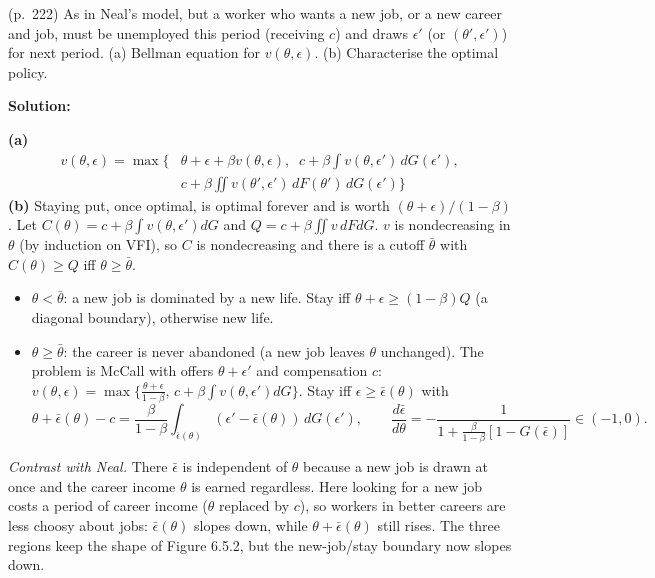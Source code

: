 \documentclass[12pt, letterpaper]{article}
\begin{document}
\begin{tcolorbox}[oddbox,title={Exercise 6.27 \quad Neal Model with Unemployment}]
\begin{tcolorbox}[questionbox]
(p.~222) As in Neal's model, but a worker who wants a new job, or a new career and job, must be unemployed
this period (receiving $c$) and draws $\epsilon'$ (or $(\theta',\epsilon')$) for next period. (a) Bellman equation for
$v(\theta,\epsilon)$. (b) Characterise the optimal policy.
\end{tcolorbox}

\textbf{Solution:}

\textbf{(a)}
\[
\boxed{\begin{aligned}v(\theta,\epsilon)=\max\Big\{&\theta+\epsilon+\beta v(\theta,\epsilon),\;\;c+\beta\int v(\theta,\epsilon')\,dG(\epsilon'),\\&c+\beta\iint v(\theta',\epsilon')\,dF(\theta')\,dG(\epsilon')\Big\}\end{aligned}}
\]
\textbf{(b)} Staying put, once optimal, is optimal forever and is worth $(\theta+\epsilon)/(1-\beta)$. Let
$C(\theta)=c+\beta\int v(\theta,\epsilon')dG$ and $Q=c+\beta\iint v\,dFdG$. $v$ is nondecreasing in $\theta$ (by induction on
VFI), so $C$ is nondecreasing and there is a cutoff $\bar\theta$ with $C(\theta)\ge Q$ iff $\theta\ge\bar\theta$.
\begin{itemize}[itemsep=2pt]
\item $\theta<\bar\theta$: a new job is dominated by a new life. Stay iff $\theta+\epsilon\ge(1-\beta)Q$ (a diagonal boundary), otherwise
new life.
\item $\theta\ge\bar\theta$: the career is never abandoned (a new job leaves $\theta$ unchanged). The problem is McCall with
offers $\theta+\epsilon'$ and compensation $c$: $v(\theta,\epsilon)=\max\{\frac{\theta+\epsilon}{1-\beta},\,c+\beta\int v(\theta,\epsilon')dG\}$. Stay iff
$\epsilon\ge\bar\epsilon(\theta)$ with
\[
\theta+\bar\epsilon(\theta)-c=\frac{\beta}{1-\beta}\int_{\bar\epsilon(\theta)}(\epsilon'-\bar\epsilon(\theta))\,dG(\epsilon'),
\qquad
\frac{d\bar\epsilon}{d\theta}=-\frac{1}{1+\frac{\beta}{1-\beta}[1-G(\bar\epsilon)]}\in(-1,0).
\]
\end{itemize}
\emph{Contrast with Neal.} There $\bar\epsilon$ is independent of $\theta$ because a new job is drawn at once and the
career income $\theta$ is earned regardless. Here looking for a new job costs a period of career income
($\theta$ replaced by $c$), so workers in better careers are less choosy about jobs: $\bar\epsilon(\theta)$ slopes down, while
$\theta+\bar\epsilon(\theta)$ still rises. The three regions keep the shape of Figure 6.5.2, but the new-job/stay boundary
now slopes down.


\end{tcolorbox}
\end{document}
